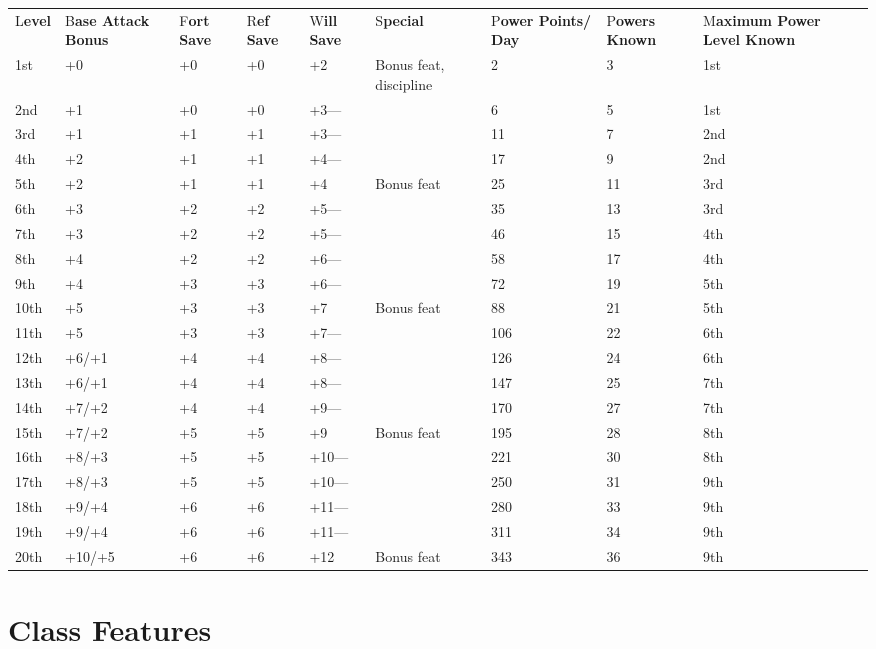\documentclass{article}
\begin{document}
\vspace{12pt}
\begin{tabular}{|>{\raggedright}p{17pt}|>{\raggedright}p{19pt}|>{\raggedright}p{12pt}|>{\raggedright}p{12pt}|>{\raggedright}p{14pt}|>{\raggedright}p{61pt}|>{\raggedright}p{26pt}|>{\raggedright}p{24pt}|>{\raggedright}p{52pt}|}
\hline
\multicolumn{9}{|p{242pt}|}{\section*{T\textbf{able: The Psion}}}\tabularnewline
\hline
L\textbf{evel } & B\textbf{ase Attack Bonus } & F\textbf{ort Save} & R\textbf{ef 
Save} & W\textbf{ill Save} & S\textbf{pecial } & P\textbf{ower Points/}\linebreak{}
\textbf{Day} & P\textbf{owers Known} & M\textbf{aximum Power Level Known}\tabularnewline
\hline
1st & +0 & +0 & +0 & +2 & Bonus feat, discipline & 2 & 3 & 1st\tabularnewline
\hline
2nd & +1 & +0 & +0 & +3--- &  & 6 & 5 & 1st\tabularnewline
\hline
3rd & +1 & +1 & +1 & +3--- &  & 11 & 7 & 2nd\tabularnewline
\hline
4th & +2 & +1 & +1 & +4--- &  & 17 & 9 & 2nd\tabularnewline
\hline
5th & +2 & +1 & +1 & +4 & Bonus feat & 25 & 11 & 3rd\tabularnewline
\hline
6th & +3 & +2 & +2 & +5--- &  & 35 & 13 & 3rd\tabularnewline
\hline
7th & +3 & +2 & +2 & +5--- &  & 46 & 15 & 4th\tabularnewline
\hline
8th & +4 & +2 & +2 & +6--- &  & 58 & 17 & 4th\tabularnewline
\hline
9th & +4 & +3 & +3 & +6--- &  & 72 & 19 & 5th\tabularnewline
\hline
10th & +5 & +3 & +3 & +7 & Bonus feat & 88 & 21 & 5th\tabularnewline
\hline
11th & +5 & +3 & +3 & +7--- &  & 106 & 22 & 6th\tabularnewline
\hline
12th & +6/+1 & +4 & +4 & +8--- &  & 126 & 24 & 6th\tabularnewline
\hline
13th & +6/+1 & +4 & +4 & +8--- &  & 147 & 25 & 7th\tabularnewline
\hline
14th & +7/+2 & +4 & +4 & +9--- &  & 170 & 27 & 7th\tabularnewline
\hline
15th & +7/+2 & +5 & +5 & +9 & Bonus feat & 195 & 28 & 8th\tabularnewline
\hline
16th & +8/+3 & +5 & +5 & +10--- &  & 221 & 30 & 8th\tabularnewline
\hline
17th & +8/+3 & +5 & +5 & +10--- &  & 250 & 31 & 9th\tabularnewline
\hline
18th & +9/+4 & +6 & +6 & +11--- &  & 280 & 33 & 9th\tabularnewline
\hline
19th & +9/+4 & +6 & +6 & +11--- &  & 311 & 34 & 9th\tabularnewline
\hline
20th & +10/+5 & +6 & +6 & +12 & Bonus feat & 343 & 36 & 9th\tabularnewline
\hline
\end{tabular}

\vspace{12pt}
\section*{\textbf{Class Features}}
\end{document}
